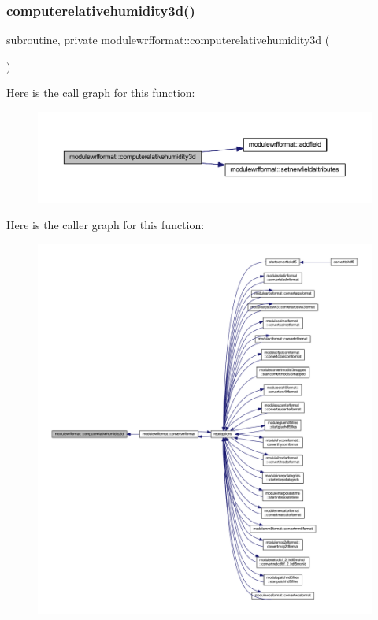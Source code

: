 \subsubsection{\texorpdfstring{computerelativehumidity3d()}{computerelativehumidity3d()}}
{\footnotesize\ttfamily subroutine, private modulewrfformat\+::computerelativehumidity3d (\begin{DoxyParamCaption}{ }\end{DoxyParamCaption})\hspace{0.3cm}{\ttfamily [private]}}

Here is the call graph for this function\+:\nopagebreak
\begin{figure}[H]
\begin{center}
\leavevmode
\includegraphics[width=350pt]{namespacemodulewrfformat_a6471c4d2451b637d8c0fbc19ec57d7f7_cgraph}
\end{center}
\end{figure}
Here is the caller graph for this function\+:\nopagebreak
\begin{figure}[H]
\begin{center}
\leavevmode
\includegraphics[width=350pt]{namespacemodulewrfformat_a6471c4d2451b637d8c0fbc19ec57d7f7_icgraph}
\end{center}
\end{figure}
\mbox{\label{namespacemodulewrfformat_ad1de435678b34be1e80362a0f088aacc}} 
